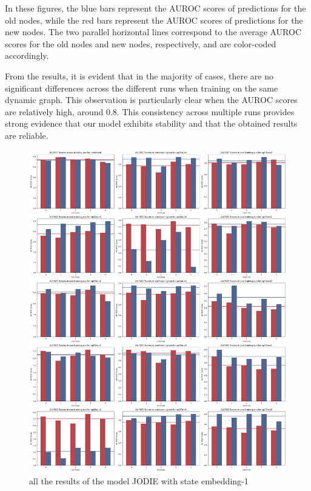 In these figures, the blue bars represent the AUROC scores of predictions for the old nodes, while the red bars represent the AUROC scores of predictions for the new nodes. The two parallel horizontal lines correspond to the average AUROC scores for the old nodes and new nodes, respectively, and are color-coded accordingly.

From the results, it is evident that in the majority of cases, there are no significant differences across the different runs when training on the same dynamic graph. This observation is particularly clear when the AUROC scores are relatively high, around 0.8. This consistency across multiple runs provides strong evidence that our model exhibits stability and that the obtained results are reliable.


\begin{figure}
    \centering
    \includegraphics[width=\textwidth]{figures/05_all_results1.png}
    \caption{all the results of the model JODIE with state embedding-1} 
    \label{fig:all_results1}
\end{figure}


